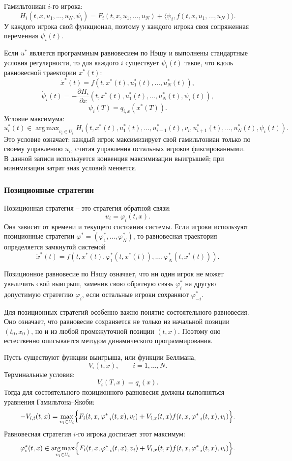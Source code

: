 \documentclass[12pt,a4paper]{article}
\DeclareMathOperator*{\argmax}{arg\,max}
\begin{document}
Гамильтониан $i$-го игрока:
\[
 H_i(t,x,u_1,\ldots,u_N,\psi_i)=F_i(t,x,u_1,\ldots,u_N)+\langle\psi_i,f(t,x,u_1,\ldots,u_N)\rangle.
\]
У каждого игрока свой функционал, поэтому у каждого игрока своя сопряженная переменная $\psi_i(t)$.

Если $u^*$ является программным равновесием по Нэшу и выполнены стандартные условия регулярности, то для каждого $i$ существует $\psi_i(t)$ такое, что вдоль равновесной траектории $x^*(t)$:
\[
 \dot x^*(t)=f(t,x^*(t),u_1^*(t),\ldots,u_N^*(t)),
\]
\[
 \dot\psi_i(t)=-\frac{\partial H_i}{\partial x}(t,x^*(t),u_1^*(t),\ldots,u_N^*(t),\psi_i(t)),
\]
\[
 \psi_i(T)=q_{i,x}(x^*(T)).
\]
Условие максимума:
\[
 u_i^*(t)\in\argmax_{v_i\in U_i}H_i(t,x^*(t),u_1^*(t),\ldots,u_{i-1}^*(t),v_i,u_{i+1}^*(t),\ldots,u_N^*(t),\psi_i(t)).
\]
Это условие означает: каждый игрок максимизирует свой гамильтониан только по своему управлению $u_i$, считая управления остальных игроков фиксированными. В данной записи используется конвенция максимизации выигрышей; при минимизации затрат знак условий меняется.

\subsubsection{Позиционные стратегии}

Позиционная стратегия -- это стратегия обратной связи:
\[
 u_i=\varphi_i(t,x).
\]
Она зависит от времени и текущего состояния системы. Если игроки используют позиционные стратегии $\varphi^*=(\varphi_1^*,\ldots,\varphi_N^*)$, то равновесная траектория определяется замкнутой системой
\[
 \dot x^*(t)=f(t,x^*(t),\varphi_1^*(t,x^*(t)),\ldots,\varphi_N^*(t,x^*(t))).
\]

Позиционное равновесие по Нэшу означает, что ни один игрок не может увеличить свой выигрыш, заменив свою обратную связь $\varphi_i^*$ на другую допустимую стратегию $\varphi_i$, если остальные игроки сохраняют $\varphi_{-i}^*$.

Для позиционных стратегий особенно важно понятие состоятельного равновесия. Оно означает, что равновесие сохраняется не только из начальной позиции $(t_0,x_0)$, но и из любой промежуточной позиции $(t,x)$. Поэтому оно естественно описывается методом динамического программирования.

Пусть существуют функции выигрыша, или функции Беллмана,
\[
 V_i(t,x),\qquad i=1,\ldots,N.
\]
Терминальные условия:
\[
 V_i(T,x)=q_i(x).
\]
Тогда для состоятельного позиционного равновесия должны выполняться уравнения Гамильтона--Якоби:
\[
 -V_{i,t}(t,x)=\max_{v_i\in U_i}\Bigl\{F_i(t,x,\varphi_{-i}^*(t,x),v_i)+V_{i,x}(t,x)f(t,x,\varphi_{-i}^*(t,x),v_i)\Bigr\}.
\]
Равновесная стратегия $i$-го игрока достигает этот максимум:
\[
 \varphi_i^*(t,x)\in\argmax_{v_i\in U_i}\Bigl\{F_i(t,x,\varphi_{-i}^*(t,x),v_i)+V_{i,x}(t,x)f(t,x,\varphi_{-i}^*(t,x),v_i)\Bigr\}.
\]
\end{document}
